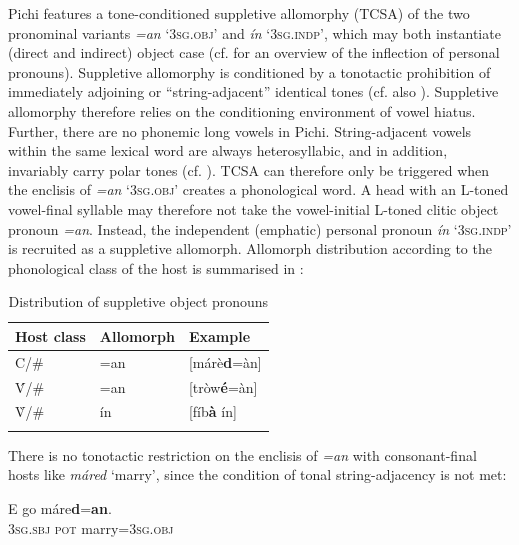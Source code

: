 Pichi features a tone-conditioned suppletive allomorphy (TCSA) of the two pronominal variants \textit{=an} \textsc{‘3sg.obj’} and \textit{ín} ‘\textsc{3sg.indp’}, which may both instantiate (direct and indirect) object case (cf.  for an overview of the inflection of personal pronouns). Suppletive allomorphy is conditioned by a tonotactic prohibition of immediately adjoining or “string-adjacent” \citep{Suzuki1998} identical tones (cf. also ). Suppletive allomorphy therefore relies on the conditioning environment of vowel hiatus. Further, there are no phonemic long vowels in Pichi. String-adjacent vowels within the same lexical word are always heterosyllabic, and in addition, invariably carry polar tones (cf. ). TCSA can therefore only be triggered when the enclisis of \textit{=an} \textsc{‘3sg.obj’} creates a phonological word. A head with an L-toned vowel-final syllable may therefore not take the vowel-initial L-toned clitic object pronoun \textit{=an}. Instead, the independent (emphatic) personal pronoun \textit{ín} \textsc{‘3sg.indp’} is recruited as a suppletive allomorph. Allomorph distribution according to the phonological class of the host is summarised in :

\begin{table}
\caption{Distribution of suppletive object pronouns}
\label{tab:key:3.4}

\begin{tabularx}{.8\textwidth}{XXl}
\lsptoprule
{Host class} & {Allomorph} & {Example}\\
\midrule
C/{\longrule}\# & =an & [márè\textbf{d}=àn]\\
\'{V}/{\longrule}\# & =an & [tròw\textbf{é}=àn]\\
\`{V}/{\longrule}\# & ín & [fíb\textbf{à} ín]\\
\lspbottomrule
\end{tabularx}
\end{table}

There is no tonotactic restriction on the enclisis of \textit{=an} with consonant-final hosts like \textit{máred} ‘marry’, since the condition of tonal string-adjacency is not met: 


\ea%
    \label{ex:key:66}
    \gll   E    go  máre\textbf{d}=\textbf{an}.\\
\textsc{3sg.sbj}  \textsc{pot}  marry=\textsc{3sg.obj}\\

